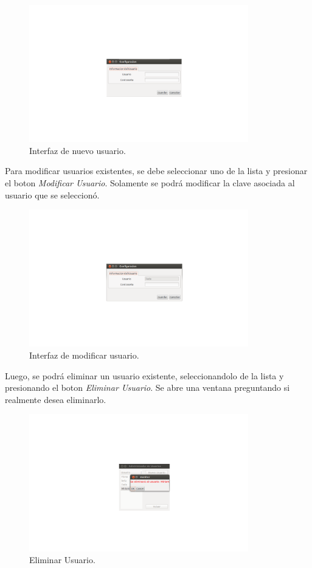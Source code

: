 \documentclass{article}
\begin{document}
	\begin{figure}[h]
       \centering
       \includegraphics[width=0.85\textwidth]{NuevoUsuario.png}
	\bigskip
       \caption{Interfaz de nuevo usuario.}
	\end{figure}
	Para modificar usuarios existentes, se debe seleccionar uno de la lista y presionar el boton \textit{Modificar Usuario}. Solamente se podrá modificar la clave asociada al usuario que se seleccionó.
	\begin{figure}[h]
       \centering
       \includegraphics[width=0.85\textwidth]{ModifUsuario.png}
	\bigskip
       \caption{Interfaz de modificar usuario.}
	\end{figure}
	Luego, se podrá eliminar un usuario existente, seleccionandolo de la lista y presionando el boton \textit{Eliminar Usuario}. Se abre una ventana preguntando si realmente desea eliminarlo.
	\begin{figure}[h]
       \centering
       \includegraphics[width=0.85\textwidth]{EliminarUsuario.png}
	\bigskip
       \caption{Eliminar Usuario.}
	\end{figure}
\end{document}
